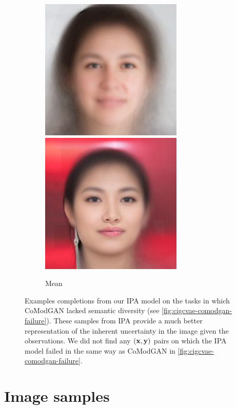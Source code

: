 \begin{figure}[t]
\begin{subfigure}[t]{0.1\textwidth}
    \includegraphics[height=\cmgfailureimgheight]{figs/cigcvae/co_mod_gan_failure/avg_aipo_1_4_2.jpg}
    \includegraphics[height=\cmgfailureimgheight]{figs/cigcvae/co_mod_gan_failure/avg_aipo_56_4_12.jpg}
    \caption{\scriptsize Mean}
  \end{subfigure}
  \caption{Examples completions from our IPA model on the tasks in which CoModGAN lacked semantic diversity (see
    \cref{fig:cigcvae-comodgan-failure}). These samples from IPA provide a much better
    representation of the inherent uncertainty in the image given the
    observations. We did not find any $({\mathbf{x}}, {\mathbf{y}})$ pairs on which the IPA
    model failed in the same way as CoModGAN in \cref{fig:cigcvae-comodgan-failure}. }
  \label{fig:cigcvae-comodgan-failure-aipo}
\end{figure}

\section{Image samples}\label{supp:cigcvae-image-samples}



